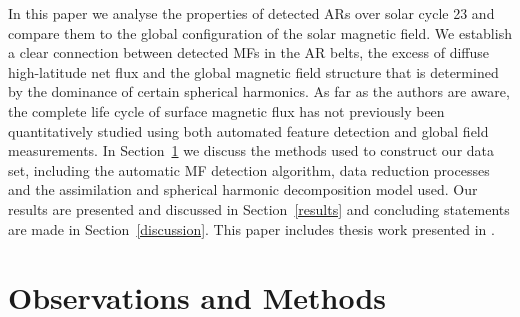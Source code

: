 \documentclass[namedreferences]{solarphysics}
\begin{document}
\begin{article}

In this paper we analyse the properties of detected ARs over solar cycle 23 and compare them to the global configuration of the solar magnetic field. %
We establish a clear connection between detected MFs in the AR belts, the excess of diffuse high-latitude net flux and the global magnetic field structure that is determined by the dominance of certain spherical harmonics. As far as the authors are aware, the complete life cycle of surface magnetic flux has not previously been quantitatively studied using both automated feature detection and global field measurements.  
In Section~\ref{obs_and_meth} we discuss the methods used to construct our data set, including the automatic MF detection algorithm, data reduction processes and the assimilation and spherical harmonic decomposition model used. Our results are presented and discussed in Section~\ref{results} and concluding statements are made in Section~\ref{discussion}. This paper includes thesis work presented in  \citet{Higgins:thesis}.


\section{Observations and Methods}\label{obs_and_meth}


\end{article}
\end{document}
